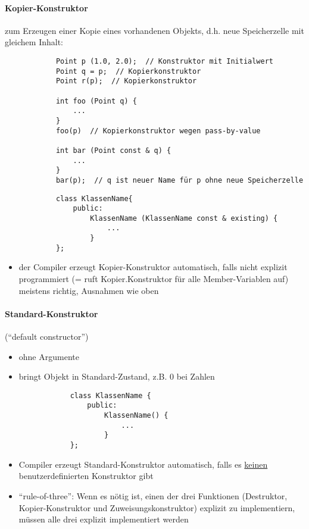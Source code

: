 \documentclass{article}
\begin{document}
\paragraph{Kopier-Konstruktor} 
		zum Erzeugen einer Kopie eines vorhandenen Objekts, d.h. neue Speicherzelle mit gleichem Inhalt:
		\begin{lstlisting}
			Point p (1.0, 2.0);  // Konstruktor mit Initialwert
			Point q = p;  // Kopierkonstruktor
			Point r(p);  // Kopierkonstruktor

			int foo (Point q) {
				...
			} 
			foo(p)  // Kopierkonstruktor wegen pass-by-value

			int bar (Point const & q) {
			    ...
			}
			bar(p);  // q ist neuer Name für p ohne neue Speicherzelle
		\end{lstlisting}
		\begin{lstlisting}
			class KlassenName{
				public:
					KlassenName (KlassenName const & existing) {
					    ...
					}
			};
		\end{lstlisting}
		\begin{itemize}
			\item der Compiler erzeugt Kopier-Konstruktor automatisch, falls nicht explizit programmiert (= ruft Kopier.Konstruktor für alle Member-Variablen auf) \\
			meistens richtig, Ausnahmen wie oben
		\end{itemize}
\paragraph{Standard-Konstruktor}
	(``default constructor'')
	\begin{itemize}
		\item ohne Argumente
		\item bringt Objekt in Standard-Zustand, z.B. $0$ bei Zahlen
		\begin{lstlisting}
			class KlassenName {
			    public: 
			 		KlassenName() {
			 		    ...
			 		}   
			};
		\end{lstlisting}
		\item Compiler erzeugt Standard-Konstruktor automatisch, falls es \underline{keinen} benutzerdefinierten Konstruktor gibt
		\item ``rule-of-three'': Wenn es nötig ist, einen der drei Funktionen (Destruktor, Kopier-Konstruktor und Zuweisungskonstruktor) explizit zu implementiern, müssen alle drei explizit implementiert werden
	\end{itemize}
\end{document}
